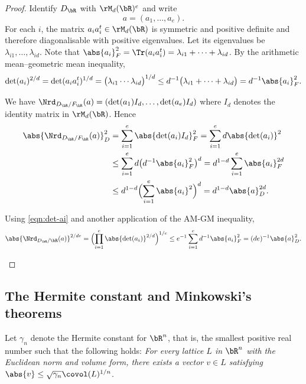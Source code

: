\begin{proof}
Identify $D_\bR$ with $\rM_d(\bR)^e$ and write
\[
a = (a_1, \dotsc, a_e).
\]
For each $i$, the matrix $a_i a_i^t \in \rM_d(\bR)$ is symmetric and positive definite and therefore diagonalisable with positive eigenvalues. Let its eigenvalues be $\lambda_{i1}, \dotsc, \lambda_{id}$.
Note that $\abs{a_i}_F^2 = \Tr(a_i a_i^t) = \lambda_{i1} + \dotsb + \lambda_{id}$.
By the arithmetic mean--geometric mean inequality,
\begin{equation} \label{eqn:det-ai}
\det(a_i)^{2/d} = \det(a_i a_i^t)^{1/d} = \bigl( \lambda_{i1} \dotsm \lambda_{id} \bigr)^{1/d} \leq d^{-1} \bigl( \lambda_{i1} + \dotsb + \lambda_{id} \bigr) = d^{-1} \abs{a_i}_F^2.
\end{equation}

\begin{enumeratei}
\item We have $\Nrd_{D_\bR/F_\bR}(a) = (\det(a_1) I_d, \dotsc, \det(a_e)I_d)$ where $I_d$ denotes the identity matrix in $\rM_d(\bR)$.
Hence
\begin{align*}
\abs{\Nrd_{D_\bR/F_\bR}(a)}_D^2
& = \sum_{i=1}^e \abs{\det(a_i) I_d}_F^2
= \sum_{i=1}^e d \abs{\det(a_i)}^2
\\& \leq \sum_{i=1}^e d \bigl( d^{-1} \abs{a_i}_F^2 \bigr)^{d}
= d^{1-d} \sum_{i=1}^e \abs{a_i}_F^{2d}
\\& \leq d^{1-d} \Bigl( \sum_{i=1}^e \abs{a_i}^2 \Bigr)^d
= d^{1-d} \abs{a}_D^{2d}.
\end{align*}

\item Using \eqref{eqn:det-ai} and another application of the AM-GM inequality,
\[
\abs{\Nrd_{D_\bR/\bR}(a)}^{2/de} = \Bigl( \prod_{i=1}^e \abs{\det(a_i)}^{2/d} \Bigr)^{1/e}
\leq e^{-1} \sum_{i=1}^e d^{-1} \abs{a_i}_F^2 = (de)^{-1} \abs{a}_D^2.
\qedhere
\]
\end{enumeratei}
\end{proof}

\subsection{The Hermite constant and Minkowski's theorems}

Let $\gamma_n$ denote the Hermite constant for $\bR^n$, that is, the smallest positive real number such that the following holds:
\textit{For every lattice $L$ in $\bR^n$ with the Euclidean norm and volume form, there exists a vector $v \in L$ satisfying $\abs{v} \leq \sqrt{\gamma_n} \covol(L)^{1/n}$.}


